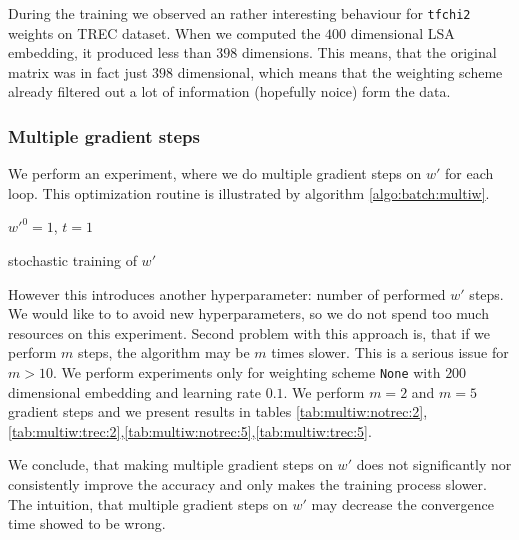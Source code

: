     During the training we observed an rather interesting behaviour for \texttt{tfchi2} weights on TREC dataset.
    When we computed the $400$ dimensional LSA embedding, it produced less than $398$ dimensions. 
    This means, that the original matrix was in fact just $398$ dimensional, 
    which means that the weighting scheme already filtered out a lot of information (hopefully noice) form the data. 

    \subsubsection{Multiple gradient steps}
    
    We perform an experiment, where we do multiple gradient steps on $w'$ for each loop. 
    This optimization routine is illustrated by algorithm \ref{algo:batch:multiw}.
    
    \begin{algorithm}[H]
        $w'^0 = 1$, $t=1$\;
        \caption{stochastic training of $w'$} \label{algo:batch:multiw}
    \end{algorithm}
    
    However this introduces another hyperparameter: number of performed $w'$ steps.
    We would like to to avoid new hyperparameters, so we do not spend too much resources on this experiment.
    Second problem with this approach is, that if we perform $m$ steps, the algorithm may be $m$ times slower. 
    This is a serious issue for $m>10$. 
    We perform experiments only for weighting scheme \texttt{None} with $200$ dimensional embedding and learning rate $0.1$.
    We perform $m=2$ and $m=5$ gradient steps and we present results in tables \ref{tab:multiw:notrec:2},
    \ref{tab:multiw:trec:2},\ref{tab:multiw:notrec:5},\ref{tab:multiw:trec:5}.
    
    

    We conclude, that making multiple gradient steps on $w'$ does not significantly nor consistently improve the accuracy and only makes the training process slower.
    The intuition, that multiple gradient steps on $w'$ may decrease the convergence time showed to be wrong.


